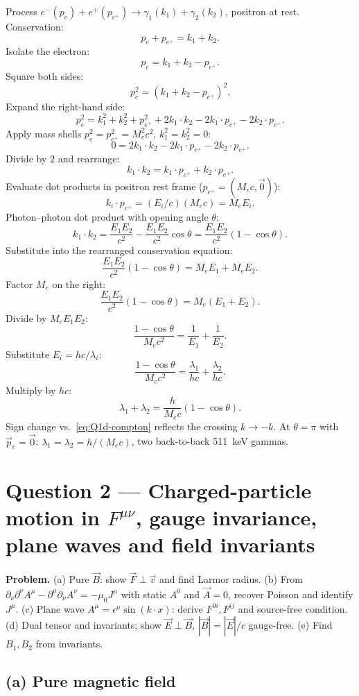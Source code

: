 \documentclass[11pt]{article}
\begin{document}
Process $e^-(p_e)+e^+(p_{e^+})\to\gamma_1(k_1)+\gamma_2(k_2)$, positron at rest. Conservation:
\[ p_e+p_{e^+}=k_1+k_2. \]
Isolate the electron:
\[ p_e=k_1+k_2-p_{e^+}. \]
Square both sides:
\[ p_e^2=(k_1+k_2-p_{e^+})^2. \]
Expand the right-hand side:
\[ p_e^2=k_1^2+k_2^2+p_{e^+}^2+2k_1\cdot k_2-2k_1\cdot p_{e^+}-2k_2\cdot p_{e^+}. \]
Apply mass shells $p_e^2=p_{e^+}^2=M_e^2c^2$, $k_1^2=k_2^2=0$:
\[ 0=2k_1\cdot k_2-2k_1\cdot p_{e^+}-2k_2\cdot p_{e^+}. \]
Divide by $2$ and rearrange:
\[ k_1\cdot k_2=k_1\cdot p_{e^+}+k_2\cdot p_{e^+}. \]
Evaluate dot products in positron rest frame ($p_{e^+}=(M_ec,\vec 0)$):
\[ k_i\cdot p_{e^+}=(E_i/c)(M_ec)=M_eE_i. \]
Photon--photon dot product with opening angle $\theta$:
\[ k_1\cdot k_2=\frac{E_1E_2}{c^2}-\frac{E_1E_2}{c^2}\cos\theta=\frac{E_1E_2}{c^2}(1-\cos\theta). \]
Substitute into the rearranged conservation equation:
\[ \frac{E_1E_2}{c^2}(1-\cos\theta)=M_eE_1+M_eE_2. \]
Factor $M_e$ on the right:
\[ \frac{E_1E_2}{c^2}(1-\cos\theta)=M_e(E_1+E_2). \]
Divide by $M_eE_1E_2$:
\[ \frac{1-\cos\theta}{M_ec^2}=\frac{1}{E_1}+\frac{1}{E_2}. \]
Substitute $E_i=hc/\lambda_i$:
\[ \frac{1-\cos\theta}{M_ec^2}=\frac{\lambda_1}{hc}+\frac{\lambda_2}{hc}. \]
Multiply by $hc$:
\begin{equation}
\boxed{\,\lambda_1+\lambda_2=\frac{h}{M_ec}(1-\cos\theta).\,}
\end{equation}
Sign change vs.\ \eqref{eq:Q1d-compton} reflects the crossing $k\to-k$. At $\theta=\pi$ with $\vec p_e=\vec 0$: $\lambda_1=\lambda_2=h/(M_ec)$, two back-to-back \SI{511}{keV} gammas.

\section*{Question 2 --- Charged-particle motion in $F^{\mu\nu}$, gauge invariance, plane waves and field invariants}

\textbf{Problem.} (a) Pure $\vec B$: show $\vec F\perp\vec v$ and find Larmor radius. (b) From $\partial_\nu\partial^\nu A^\mu-\partial^\mu\partial_\nu A^\nu=-\mu_0 J^\mu$ with static $A^0$ and $\vec A=0$, recover Poisson and identify $J^\mu$. (c) Plane wave $A^\mu=\epsilon^\mu\sin(k\cdot x)$: derive $F^{0i},F^{ij}$ and source-free condition. (d) Dual tensor and invariants; show $\vec E\perp\vec B$, $|\vec B|=|\vec E|/c$ gauge-free. (e) Find $B_1,B_2$ from invariants.

\subsection*{(a) Pure magnetic field}
\end{document}
